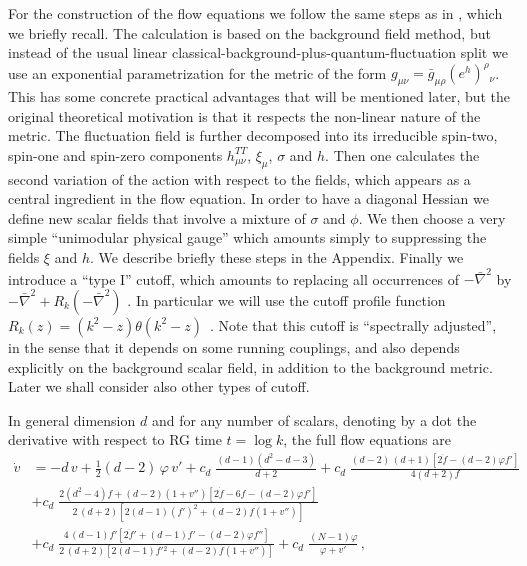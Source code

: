 \documentclass[11pt]{book} %
\newcommand{\bnabla}{\bar\nabla}
\numberwithin{equation}{chapter}
\begin{document}
For the construction of the flow equations we follow the same steps
as in \cite{Percacci:2015wwa}, which we briefly recall.
The calculation is based on the background field method,
but instead of the usual linear classical-background-plus-quantum-fluctuation split we
use an exponential parametrization
for the metric of the form
$g_{\mu\nu}=\bar g_{\mu\rho}(e^h)^\rho{}_\nu$.
This has some concrete practical advantages that will be
mentioned later,
but the original theoretical motivation is that it
respects the non-linear nature of the metric.
The fluctuation field is further decomposed into its irreducible
spin-two, spin-one and spin-zero components $h_{\mu\nu}^{TT}$,
$\xi_\mu$, $\sigma$ and $h$.
Then one calculates the second variation of the action with
respect to the fields, which appears as a central ingredient
in the flow equation.
In order to have a diagonal Hessian we define new scalar fields
that involve a mixture of $\sigma$ and $\phi$.
We then choose a very simple ``unimodular physical gauge''
which amounts simply to suppressing the fields $\xi$ and $h$.
We describe briefly these steps in the Appendix.
Finally we introduce a ``type I'' cutoff, which amounts to replacing
all occurrences of $-\bnabla^2$ by $-\bnabla^2+R_k(-\bnabla^2)$
\cite{Codello:2008vh}.
In particular we will use the cutoff profile function
$R_k(z)=\left(k^2-z\right)\theta\left(k^2-z\right)$~\cite{Litim:2001up}.
Note that this cutoff is ``spectrally adjusted'',
in the sense that it depends on some running couplings,
and also depends explicitly on the background scalar field,
in addition to the background metric.
Later we shall consider also other types of cutoff.

In general dimension $d$ and for any number of scalars,
denoting by a dot the derivative with respect to RG time $t=\log k$,
the full flow equations are
\begin{align}
  \dot v &= - d \, v + \frac{1}{2} (d-2) \, \varphi \, v'
    + c_d \; \frac{(d-1) \left( d^2 - d - 3 \right)} {d+2}
    + c_d \; \frac{ (d-2) \, (d+1) \left[ 2 \dot f - (d-2) \varphi f' \right] }{4 \left( d+2 \right) f} \nonumber \\[3mm]
  & + c_d \; \frac{ 2 \left( d^2 - 4 \right) f + (d - 2) \left( 1 + v'' \right) \left[ 2 \dot f - 6 f - (d - 2) \varphi f' \right] }
                  { 2 \, (d+2) \left[ 2 (d-1) \left( f' \right)^2 + (d-2) f \left( 1 + v'' \right) \right] } \nonumber \\[3mm]
  & + c_d \; \frac{ 4 \, (d - 1) f' \left[ 2 \dot f' + (d - 1) f' - (d - 2) \varphi f'' \right] }
                  { 2 \, (d+2) \left[ 2 (d-1) f'{}^2 + (d-2) f \left( 1 + v'' \right) \right] }
    + c_d \; \frac{(N-1)\varphi}{\varphi+v'} \,,
  \label{flowvfull}
\end{align}
\end{document}
